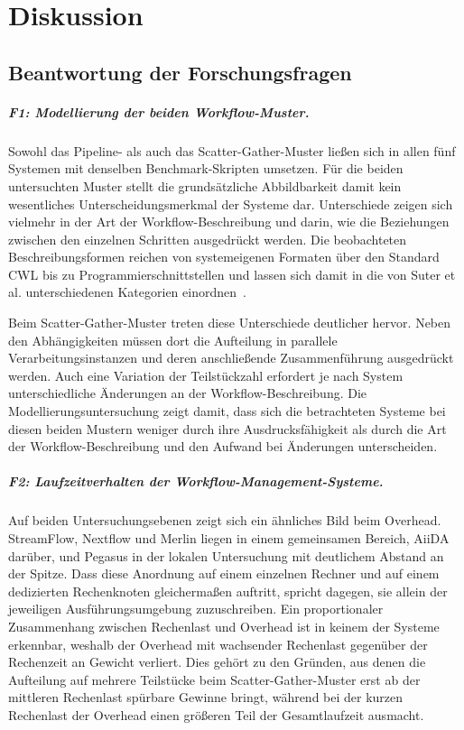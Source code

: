 
\chapter{Diskussion}
\label{sec:diskussion}

\section{Beantwortung der Forschungsfragen}
\label{sec:diskussion:fragen}

\paragraph{F1: Modellierung der beiden Workflow-Muster.}
Sowohl das Pipeline- als auch das Scatter-Gather-Muster ließen sich
in allen fünf Systemen mit denselben Benchmark-Skripten umsetzen.
Für die beiden untersuchten Muster stellt die grundsätzliche
Abbildbarkeit damit kein wesentliches Unterscheidungsmerkmal der
Systeme dar. Unterschiede zeigen sich vielmehr in der Art der
Workflow-Beschreibung und darin, wie die Beziehungen zwischen den
einzelnen Schritten ausgedrückt werden. Die
beobachteten Beschreibungsformen reichen von systemeigenen Formaten
über den Standard CWL bis zu Programmierschnittstellen und lassen
sich damit in die von Suter et al. unterschiedenen Kategorien
einordnen~\cite[S.~8]{suter2026terminology}.

Beim Scatter-Gather-Muster treten diese Unterschiede deutlicher
hervor. Neben den Abhängigkeiten müssen dort die Aufteilung in
parallele Verarbeitungsinstanzen und deren anschließende
Zusammenführung ausgedrückt werden. Auch eine Variation der
Teilstückzahl erfordert je nach System unterschiedliche Änderungen
an der Workflow-Beschreibung. Die Modellierungsuntersuchung zeigt
damit, dass sich die betrachteten Systeme bei diesen beiden Mustern
weniger durch ihre Ausdrucksfähigkeit als durch die Art der
Workflow-Beschreibung und den Aufwand bei Änderungen unterscheiden.

\paragraph{F2: Laufzeitverhalten der Workflow-Management-Systeme.}
Auf beiden Untersuchungsebenen zeigt sich ein ähnliches Bild beim
Overhead. StreamFlow, Nextflow und Merlin liegen in einem
gemeinsamen Bereich, AiiDA darüber, und Pegasus in der lokalen
Untersuchung mit deutlichem Abstand an der Spitze. Dass
diese Anordnung auf einem einzelnen Rechner und auf einem
dedizierten Rechenknoten gleichermaßen auftritt, spricht dagegen,
sie allein der jeweiligen Ausführungsumgebung zuzuschreiben. Ein
proportionaler Zusammenhang zwischen Rechenlast und Overhead ist in
keinem der Systeme erkennbar, weshalb der Overhead mit wachsender
Rechenlast gegenüber der Rechenzeit an Gewicht verliert. Dies
gehört zu den Gründen, aus denen die Aufteilung auf mehrere
Teilstücke beim Scatter-Gather-Muster erst ab der mittleren
Rechenlast spürbare Gewinne bringt, während bei der kurzen
Rechenlast der Overhead einen größeren Teil der Gesamtlaufzeit ausmacht.

